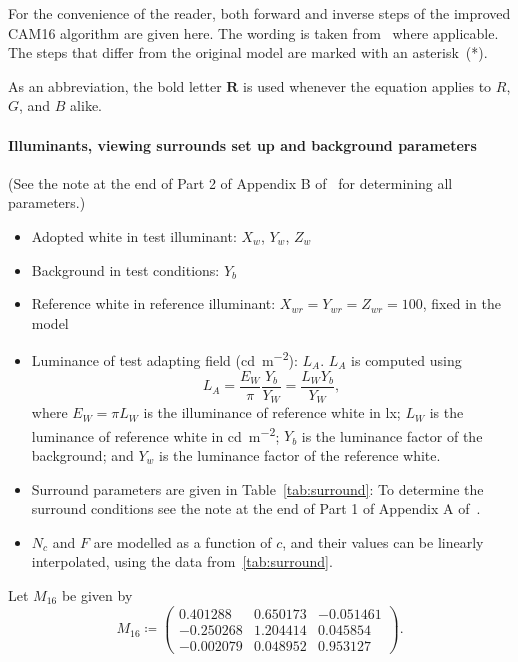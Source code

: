 \documentclass[twocolumn]{scrartcl}
\theoremstyle{named}
\newcommand\rgb{\bm{R}}
\begin{document}
For the convenience of the reader, both forward and inverse steps of the
improved CAM16 algorithm are given here. The wording is taken from~\cite{cam16}
where applicable.
The steps that differ from the original model are marked with an asterisk~(*).

As an abbreviation, the bold letter $\rgb$ is used whenever the equation applies
to $R$, $G$, and $B$ alike.

\paragraph{Illuminants, viewing surrounds set up and background
parameters}
(See the note at the end of Part 2 of Appendix B of~\cite{cam16} for determining
all parameters.)

\begin{itemize}
  \item Adopted white in test illuminant: $X_w$, $Y_w$, $Z_w$
  \item Background in test conditions: $Y_b$
  \item Reference white in reference illuminant:
    $X_{wr}=Y_{wr} = Z_{wr}=100$, fixed in the model
  \item Luminance of test adapting field (\si{\candela\per\meter\squared}): $L_A$.
$L_A$ is computed using
    \[
      L_A = \frac{E_W}{\pi} \frac{Y_b}{Y_W} = \frac{L_W Y_b}{Y_W},
    \]
  where $E_W =\pi L_W$ is the illuminance of reference white in \si{\lux};
    $L_W$ is the luminance of reference white in
    \si{\candela\per\meter\squared}; $Y_b$ is the luminance factor of the
    background; and $Y_w$ is the luminance factor of the reference white.

  \item Surround parameters are given in Table~\ref{tab:surround}:
To determine the surround conditions see the note at the
    end of Part 1 of Appendix A of~\cite{cam16}.
\item $N_c$ and $F$ are modelled as a function of $c$, and their values
  can be linearly interpolated, using the data from~\ref{tab:surround}.
\end{itemize}

Let $M_{16}$ be given by
\[
  M_{16} \coloneqq \begin{pmatrix}
    0.401288  & 0.650173 & -0.051461\\
    -0.250268 & 1.204414 & 0.045854\\
    -0.002079 & 0.048952 & 0.953127
  \end{pmatrix}.
\]
\end{document}
